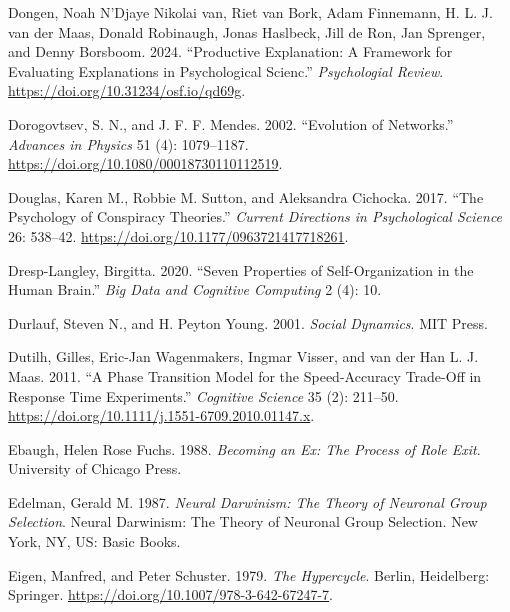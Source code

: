 \documentclass[
  a4paper,
  DIV=11,
  numbers=noendperiod,
  oneside]{scrreprt}
\newlength{\cslhangindent}
\newlength{\cslentryspacingunit} %
\newenvironment{CSLReferences}[2] %
 {%
  \setlength{\parindent}{0pt}
  \ifodd #1
  \let\oldpar\par
  \def\par{\hangindent=\cslhangindent\oldpar}
  \fi
  \setlength{\parskip}{#2\cslentryspacingunit}
 }%
 {}
\begin{document}
\begin{CSLReferences}{1}{0}
\leavevmode{}%
Dongen, Noah N'Djaye Nikolai van, Riet van Bork, Adam Finnemann, H. L.
J. van der Maas, Donald Robinaugh, Jonas Haslbeck, Jill de Ron, Jan
Sprenger, and Denny Borsboom. 2024. {``Productive Explanation: A
Framework for Evaluating Explanations in Psychological Scienc.''}
\emph{Psychologial Review}. \url{https://doi.org/10.31234/osf.io/qd69g}.

\leavevmode{}%
Dorogovtsev, S. N., and J. F. F. Mendes. 2002. {``Evolution of
Networks.''} \emph{Advances in Physics} 51 (4): 1079--1187.
\url{https://doi.org/10.1080/00018730110112519}.

\leavevmode{}%
Douglas, Karen M., Robbie M. Sutton, and Aleksandra Cichocka. 2017.
{``The Psychology of Conspiracy Theories.''} \emph{Current Directions in
Psychological Science} 26: 538--42.
\url{https://doi.org/10.1177/0963721417718261}.

\leavevmode{}%
Dresp-Langley, Birgitta. 2020. {``Seven {Properties} of
{Self-Organization} in the {Human Brain}.''} \emph{Big Data and
Cognitive Computing} 2 (4): 10.

\leavevmode{}%
Durlauf, Steven N., and H. Peyton Young. 2001. \emph{Social {Dynamics}}.
{MIT Press}.

\leavevmode{}%
Dutilh, Gilles, Eric-Jan Wagenmakers, Ingmar Visser, and van der Han L.
J. Maas. 2011. {``A {Phase Transition Model} for the {Speed-Accuracy
Trade-Off} in {Response Time Experiments}.''} \emph{Cognitive Science}
35 (2): 211--50. \url{https://doi.org/10.1111/j.1551-6709.2010.01147.x}.

\leavevmode{}%
Ebaugh, Helen Rose Fuchs. 1988. \emph{Becoming an Ex: The Process of
Role Exit}. University of Chicago Press.

\leavevmode{}%
Edelman, Gerald M. 1987. \emph{Neural {Darwinism}: {The} Theory of
Neuronal Group Selection}. Neural {Darwinism}: {The} Theory of Neuronal
Group Selection. {New York, NY, US}: {Basic Books}.

\leavevmode{}%
Eigen, Manfred, and Peter Schuster. 1979. \emph{The {Hypercycle}}.
{Berlin, Heidelberg}: {Springer}.
\url{https://doi.org/10.1007/978-3-642-67247-7}.


\end{CSLReferences}
\end{document}
